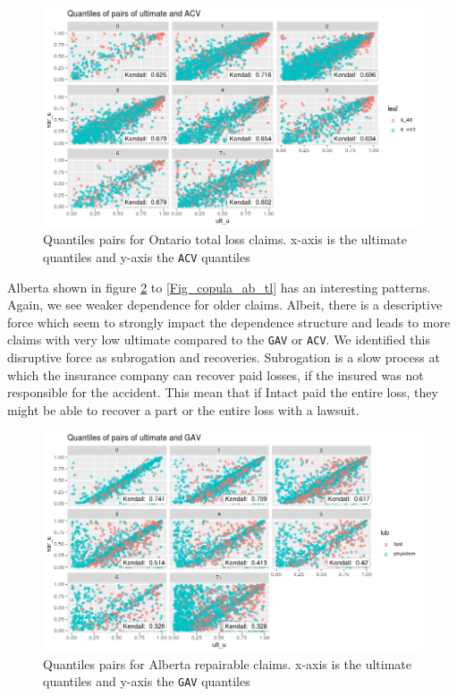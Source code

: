 	\begin{figure}[H]
		\begin{center}
			\includegraphics[scale=0.4]{Graphiques/on_tl} 
			\renewcommand{\figurename}{Figure}
			\caption{Quantiles pairs for Ontario total loss claims. x-axis is the ultimate quantiles and y-axis the \texttt{ACV} quantiles}\label{Fig_copula_on_tl}
		\end{center}
	\end{figure}
	
	Alberta shown in figure \ref{Fig_copula_ab_rep} to \ref{Fig_copula_ab_tl} has an interesting patterns. Again, we see weaker dependence for older claims. Albeit, there is a descriptive force which seem to strongly impact the dependence structure and leads to more claims with very low ultimate compared to the \texttt{GAV} or \texttt{ACV}. We identified this disruptive force as subrogation and recoveries. Subrogation is a slow process at which the insurance company can recover paid losses, if the insured was not responsible for the accident. This mean that if Intact paid the entire loss, they might be able to recover a part or the entire loss with a lawsuit. 
	
	\begin{figure}[H]
		\begin{center}
			\includegraphics[scale=0.4]{Graphiques/ab_rep} 
			\renewcommand{\figurename}{Figure}
			\caption{Quantiles pairs for Alberta repairable claims. x-axis is the ultimate quantiles and y-axis the \texttt{GAV} quantiles}\label{Fig_copula_ab_rep}
		\end{center}
	\end{figure}
	
